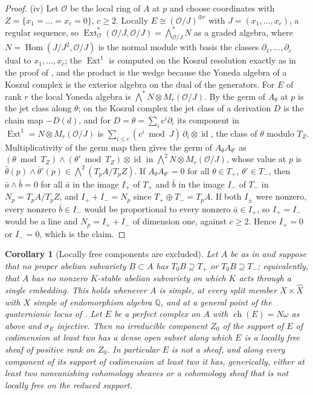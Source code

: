 \documentclass[11pt,reqno]{amsart}
\theoremstyle{plain}
\newtheorem{corollary}[theorem]{Corollary}
\theoremstyle{definition}
\theoremstyle{remark}
\newcommand{\QQ}{\mathbb{Q}}
\newcommand{\cO}{\mathcal{O}}
\DeclareMathOperator{\ch}{ch}
\DeclareMathOperator{\Hom}{Hom}
\DeclareMathOperator{\Ext}{Ext}
\DeclareMathOperator{\id}{id}
\begin{document}
\begin{proof}
(iv) Let $\cO$ be the local ring of $A$ at $p$ and choose coordinates with
$Z=\{x_{1}=\dots=x_{c}=0\}$, $c\ge2$. Locally $E\cong(\cO/J)^{\oplus r}$
with $J=(x_{1},\dots,x_{c})$, a regular sequence, so
$\Ext^{*}_{\cO}(\cO/J,\cO/J)=\bigwedge^{*}_{\cO/J}N$ as a graded algebra,
where $N=\Hom(J/J^{2},\cO/J)$ is the normal module with basis the classes
$\partial_{1},\dots,\partial_{c}$ dual to $x_{1},\dots,x_{c}$; the
$\Ext^{1}$ is computed on the Koszul resolution exactly as in the proof of
, and the product is the wedge because the Yoneda
algebra of a Koszul complex is the exterior algebra on the dual of the
generators. For $E$ of rank $r$ the local Yoneda algebra is
$\bigwedge^{*}N\otimes M_{r}(\cO/J)$. By  the germ of
$A_{\theta}$ at $p$ is the jet class along $\theta$; on the Koszul complex the
jet class of a derivation $D$ is the chain map $-D(d)$, and for
$D=\theta=\sum_{i}c^{i}\partial_{i}$ its component in $\Ext^{1}=N\otimes M_{r}(\cO/J)$
is $\sum_{i\le c}(c^{i}\bmod J)\,\partial_{i}\otimes\id$, the class of
$\theta$ modulo $T_{Z}$. Multiplicativity of the germ map then gives the germ
of $A_{\theta}A_{\theta'}$ as
$(\theta\bmod T_{Z})\wedge(\theta'\bmod T_{Z})\otimes\id$ in
$\bigwedge^{2}N\otimes M_{r}(\cO/J)$, whose value at $p$ is
$\bar\theta(p)\wedge\bar\theta'(p)\in\bigwedge^{2}(T_{p}A/T_{p}Z)$. If
$A_{\theta}A_{\theta'}=0$ for all $\theta\in T_{+}$, $\theta'\in T_{-}$,
then $\bar a\wedge\bar b=0$ for all $\bar a$ in the image $I_{+}$ of $T_{+}$
and $\bar b$ in the image $I_{-}$ of $T_{-}$ in $N_{p}=T_{p}A/T_{p}Z$, and
$I_{+}+I_{-}=N_{p}$ since $T_{+}\oplus T_{-}=T_{p}A$. If both $I_{\pm}$ were
nonzero, every nonzero $\bar b\in I_{-}$ would be proportional to every
nonzero $\bar a\in I_{+}$, so $I_{+}=I_{-}$ would be a line and
$N_{p}=I_{+}+I_{-}$ of dimension one, against $c\ge2$. Hence $I_{+}=0$ or
$I_{-}=0$, which is the claim.
\end{proof}

\begin{corollary}[Locally free components are excluded]\label{cor:p2shape}
Let $A$ be as in  and suppose that no proper abelian
subvariety $B\subset A$ has $T_{0}B\supseteq T_{+}$ or $T_{0}B\supseteq T_{-}$;
equivalently, that $A$ has no nonzero $K$-stable abelian subvariety on which
$K$ acts through a single embedding. This holds whenever $A$ is simple, at
every split member $X\times\widehat X$ with $X$ simple of endomorphism
algebra $\QQ$, and at a general point of the quaternionic locus of
\cite[Setup~15.24]{paperI}.
Let $E$ be a perfect complex on $A$ with $\ch(E)=N\omega$ as above and
$\sigma_{E}$ injective. Then no irreducible component $Z_{0}$ of the support
of $E$ of codimension at least two has a dense open subset along which $E$ is
a locally free sheaf of positive rank on $Z_{0}$. In particular $E$ is not a
sheaf, and along every component of its support of codimension at least two
it has, generically, either at least two nonvanishing cohomology sheaves or a
cohomology sheaf that is not locally free on the reduced support.
\end{corollary}
\end{document}
